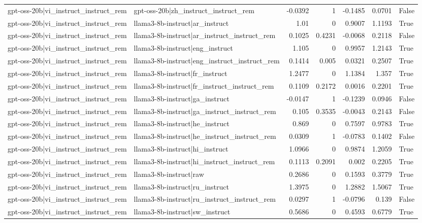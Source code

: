 \begin{table}
\begin{tabular}{l l r r r r l}
gpt-oss-20b|vi_instruct_instruct_rem & gpt-oss-20b|zh_instruct_instruct_rem & -0.0392 & 1 & -0.1485 & 0.0701 & False \\
gpt-oss-20b|vi_instruct_instruct_rem & llama3-8b-instruct|ar_instruct & 1.01 & 0 & 0.9007 & 1.1193 & True \\
gpt-oss-20b|vi_instruct_instruct_rem & llama3-8b-instruct|ar_instruct_instruct_rem & 0.1025 & 0.4231 & -0.0068 & 0.2118 & False \\
gpt-oss-20b|vi_instruct_instruct_rem & llama3-8b-instruct|eng_instruct & 1.105 & 0 & 0.9957 & 1.2143 & True \\
gpt-oss-20b|vi_instruct_instruct_rem & llama3-8b-instruct|eng_instruct_instruct_rem & 0.1414 & 0.005 & 0.0321 & 0.2507 & True \\
gpt-oss-20b|vi_instruct_instruct_rem & llama3-8b-instruct|fr_instruct & 1.2477 & 0 & 1.1384 & 1.357 & True \\
gpt-oss-20b|vi_instruct_instruct_rem & llama3-8b-instruct|fr_instruct_instruct_rem & 0.1109 & 0.2172 & 0.0016 & 0.2201 & True \\
gpt-oss-20b|vi_instruct_instruct_rem & llama3-8b-instruct|ga_instruct & -0.0147 & 1 & -0.1239 & 0.0946 & False \\
gpt-oss-20b|vi_instruct_instruct_rem & llama3-8b-instruct|ga_instruct_instruct_rem & 0.105 & 0.3535 & -0.0043 & 0.2143 & False \\
gpt-oss-20b|vi_instruct_instruct_rem & llama3-8b-instruct|he_instruct & 0.869 & 0 & 0.7597 & 0.9783 & True \\
gpt-oss-20b|vi_instruct_instruct_rem & llama3-8b-instruct|he_instruct_instruct_rem & 0.0309 & 1 & -0.0783 & 0.1402 & False \\
gpt-oss-20b|vi_instruct_instruct_rem & llama3-8b-instruct|hi_instruct & 1.0966 & 0 & 0.9874 & 1.2059 & True \\
gpt-oss-20b|vi_instruct_instruct_rem & llama3-8b-instruct|hi_instruct_instruct_rem & 0.1113 & 0.2091 & 0.002 & 0.2205 & True \\
gpt-oss-20b|vi_instruct_instruct_rem & llama3-8b-instruct|raw & 0.2686 & 0 & 0.1593 & 0.3779 & True \\
gpt-oss-20b|vi_instruct_instruct_rem & llama3-8b-instruct|ru_instruct & 1.3975 & 0 & 1.2882 & 1.5067 & True \\
gpt-oss-20b|vi_instruct_instruct_rem & llama3-8b-instruct|ru_instruct_instruct_rem & 0.0297 & 1 & -0.0796 & 0.139 & False \\
gpt-oss-20b|vi_instruct_instruct_rem & llama3-8b-instruct|sw_instruct & 0.5686 & 0 & 0.4593 & 0.6779 & True \\

\end{tabular}
\end{table}
